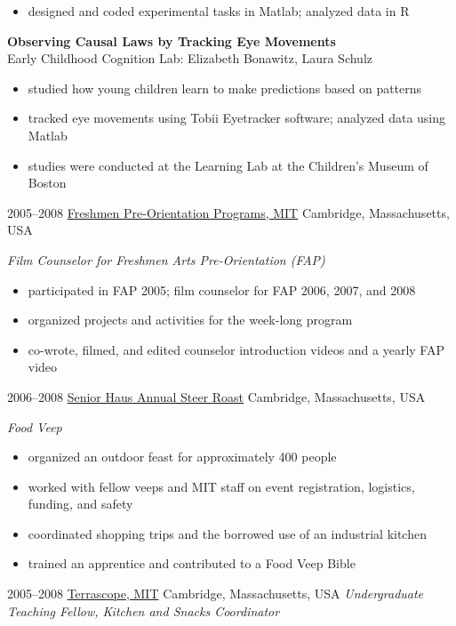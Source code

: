 \documentclass[]{friggeri-cv}
\begin{document}
\begin{entrylist}
{\begin{itemize}
		\item designed and coded experimental tasks in Matlab; analyzed data in R
	\end{itemize}
	\textbf{Observing Causal Laws by Tracking Eye Movements} \\
	Early Childhood Cognition Lab: Elizabeth Bonawitz, Laura Schulz
	\begin{itemize}
		\item studied how young children learn to make predictions based on patterns
		\item tracked eye movements using Tobii Eyetracker software; analyzed data using Matlab
		\item studies were conducted at the Learning Lab at the Children's Museum of Boston
	\end{itemize}
	}
  \entry
	{2005--2008}
	{\href{http://web.mit.edu/firstyear/}{Freshmen Pre-Orientation Programs, MIT}}
	{Cambridge, Massachusetts, USA}
	{\emph{Film Counselor for Freshmen Arts Pre-Orientation (FAP)}
	\begin{itemize}
		\item participated in FAP 2005; film counselor for FAP 2006, 2007, and 2008
		\item organized projects and activities for the week-long program
		\item co-wrote, filmed, and edited counselor introduction videos and a yearly FAP video
	\end{itemize}
	}
  \entry
	{2006--2008}
	{\href{http://web.mit.edu/senior-house/www/steerroast.html}{Senior Haus Annual Steer Roast}}
	{Cambridge, Massachusetts, USA}
	{\emph{Food Veep}
	\begin{itemize}
		\item organized an outdoor feast for approximately 400 people
		\item worked with fellow veeps and MIT staff on event registration, logistics, funding, and safety
		\item coordinated shopping trips and the borrowed use of an industrial kitchen
		\item trained an apprentice and contributed to a Food Veep Bible
	\end{itemize}
	}
  \entry
	{2005--2008}
	{\href{http://web.mit.edu/terrascope/www/}{Terrascope, MIT}}
	{Cambridge, Massachusetts, USA}
	{\emph{Undergraduate Teaching Fellow, Kitchen and Snacks Coordinator} \\
}
\end{entrylist}
\end{document}
